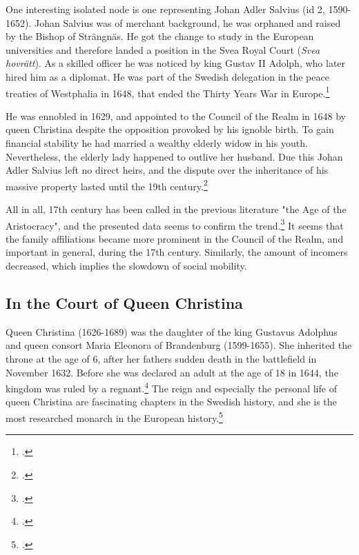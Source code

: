 One interesting isolated node is one representing Johan Adler Salvius (id 2, 1590-1652). Johan Salvius was of merchant background, he was orphaned and raised by the Bishop of Strängnäs. He got the change to study in the European universities and therefore landed a position in the Svea Royal Court (\textit{Svea hovrätt}). As a skilled officer he was noticed by king Gustav II Adolph, who later hired him as a diplomat. He was part of the Swedish delegation in the peace treaties of Westphalia in 1648, that ended the Thirty Years War in Europe.\footcite{marjomaa2000}

He was ennobled in 1629, and appointed to the Council of the Realm in 1648 by queen Christina despite the opposition provoked by his ignoble birth. To gain financial stability he had married a wealthy elderly widow in his youth. Nevertheless, the elderly lady happened to outlive her husband. Due this Johan Adler Salvius left no direct heirs, and the dispute over the inheritance of his massive property lasted until the 19th century.\footcite{marjomaa2000}

All in all, 17th century has been called in the previous literature "the Age of the Aristocracy", and the presented data seems to confirm the trend.\footcite{hakanenAndHaikari2020} It seems that the family affiliations became more prominent in the Council of the Realm, and important in general, during the 17th century. Similarly, the amount of incomers decreased, which implies the slowdown of social mobility.

\subsection{In the Court of Queen Christina}
\label{christina}
Queen Christina (1626-1689) was the daughter of the king Gustavus Adolphus and queen consort Maria Eleonora of Brandenburg (1599-1655). She inherited the throne at the age of 6, after her fathers sudden death in the battlefield in November 1632. Before she was declared an adult at the age of 18 in 1644, the kingdom was ruled by a regnant.\footcite[pp. 188-189, 288-289.]{lappalainen14} The reign and especially the personal life of queen Christina are fascinating chapters in the Swedish history, and she is the most researched monarch in the European history.\footcite[For more information see e.g. Peter Englund \textit{Silvermasken: en kort biografi över drottning Kristina} finnish version \textit{Kuningatar Kristiina}, or Marie-Louise Rodén \textit{Drottning Christina: en biografi}.]{makelaAlitaloEtAl2000}

